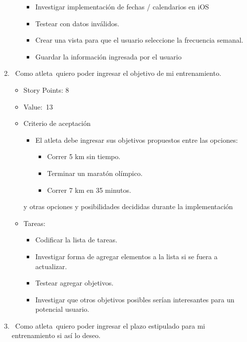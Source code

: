 \begin{enumerate}
\begin{itemize}
    \begin{itemize}
    \item
      Investigar implementación de fechas / calendarios en iOS
    \item
      Testear con datos inválidos.
    \item
      Crear una vista para que el usuario seleccione la frecuencia
      semanal.
    \item
      Guardar la información ingresada por el usuario
    \end{itemize}
  \end{itemize}
\item
  ~Como atleta~quiero poder ingresar el objetivo de mi entrenamiento.

  \begin{itemize}
  \item
    Story Points: 8
  \item
    Value:~13
  \item
    Criterio de aceptación

    \begin{itemize}
    \item
      El atleta debe ingresar sus objetivos propuestos entre las
      opciones:

      \begin{itemize}
      \item
        Correr 5 km sin tiempo.
      \item
        Terminar un maratón olímpico.
      \item
        Correr 7 km en 35 minutos.
      \end{itemize}
    \end{itemize}

    y otras opciones y posibilidades decididas durante la implementación
  \item
    Tareas:

    \begin{itemize}
    \item
      Codificar la lista de tareas.
    \item
      Investigar forma de agregar elementos a la lista si se fuera a
      actualizar.
    \item
      Testear agregar objetivos.
    \item
      Investigar que otros objetivos posibles serían interesantes para
      un potencial usuario.
    \end{itemize}
  \end{itemize}
\item
  ~Como atleta~quiero poder ingresar el plazo estipulado para mi
  entrenamiento si así lo deseo.


\end{enumerate}
